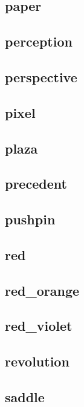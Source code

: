 \subsection{\ttfamily paper}
\newpage
\subsection{\ttfamily perception}
\newpage
\subsection{\ttfamily perspective}
\newpage
\subsection{\ttfamily pixel}
\newpage
\subsection{\ttfamily plaza}
\newpage
\subsection{\ttfamily precedent}
\newpage
\subsection{\ttfamily pushpin}
\newpage
\subsection{\ttfamily red}
\newpage
\subsection{\ttfamily red\_orange}
\newpage
\subsection{\ttfamily red\_violet}
\newpage
\subsection{\ttfamily revolution}
\newpage
\subsection{\ttfamily saddle}
\newpage
